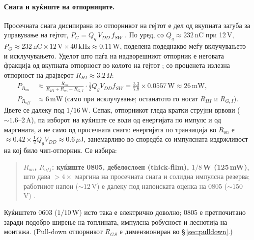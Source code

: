 \documentclass[11pt,a4paper]{article}
\newcommand{\eng}[1]{\textenglish{#1}}
\begin{document}
\paragraph{Снага и куќиште на отпорниците.} Просечната снага дисипирана во отпорникот на гејтот е дел од вкупната загуба за управување на гејтот, $P_G = Q_g\,V_{DD}\,f_{SW}$ \cite{ref5}. По уред, со $Q_g \approx 232$\,nC при 12\,V, $P_G \approx 232\,\mathrm{nC}\times 12\,\mathrm{V}\times 40\,\mathrm{kHz} \approx 0.11$\,W, поделена подеднакво меѓу вклучувањето и исклучувањето. Уделот што паѓа на надворешниот отпорник е неговата фракција од вкупната отпорност во колото на гејтот \cite{ref5}; со проценета излезна отпорност на драјверот $R_{HI}\approx 3.2\,\Omega$:
\begin{align}
P_{R_{on}} &\approx \frac{R_{on}}{R_{HI}+R_{on}+R_{G,I}}\cdot \tfrac{1}{2}Q_g V_{DD} f_{SW} = \frac{3.3}{7.9}\times 0.0557\,\mathrm{W} \approx 26\,\mathrm{mW}, \\
P_{R_{off}} &\approx 6\,\mathrm{mW}\ \text{(само при исклучување; останатото го носат $R_{HI}$ и $R_{G,I}$).}
\end{align}
Двете се далеку под $1/16$\,W. Сепак, отпорникот гледа кратки струјни врвови ($\sim 1.6$--2\,A), па изборот на куќиште се води од енергијата по импулс и од маргината, а не само од просечната снага: енергијата по транзиција во $R_{on}$ е $\approx 0.42\times \tfrac{1}{2}Q_g V_{DD} \approx 0.6\,\mu$J, занемарливо во споредба со импулсната издржливост на кој било чип-отпорник. Се избира:
\begin{quote}
\textbf{$R_{on}$, $R_{off}$: куќиште 0805, дебелослоен (\eng{thick-film}), $1/8$\,W (125\,mW)}, што дава $>4\times$ маргина на просечната снага и солидна импулсна резерва; работниот напон ($\sim 12$\,V) е далеку под напонската оценка на 0805 ($\sim 150$\,V) \cite{ref5}.
\end{quote}
Куќиштето 0603 ($1/10$\,W) исто така е електрично доволно; 0805 е претпочитано заради подобро ширење на топлината, импулсна робусност и леснотија на монтажа. (\eng{Pull-down} отпорникот $R_{GS}$ е димензиониран во \S\,\ref{sec:pulldown}.)
\end{document}
